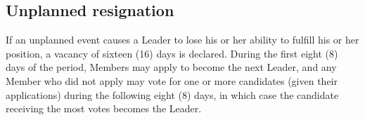 \documentclass[10pt]{book}
\begin{document}
\subsection{Unplanned resignation}

If an unplanned event causes a Leader to lose his or her ability to fulfill his or her position, a vacancy of sixteen (16) days is declared. During the first eight (8) days of the period, Members may apply to become the next Leader, and any Member who did not apply may vote for one or more candidates (given their applications) during the following eight (8) days, in which case the candidate receiving the most votes becomes the Leader.
\end{document}
